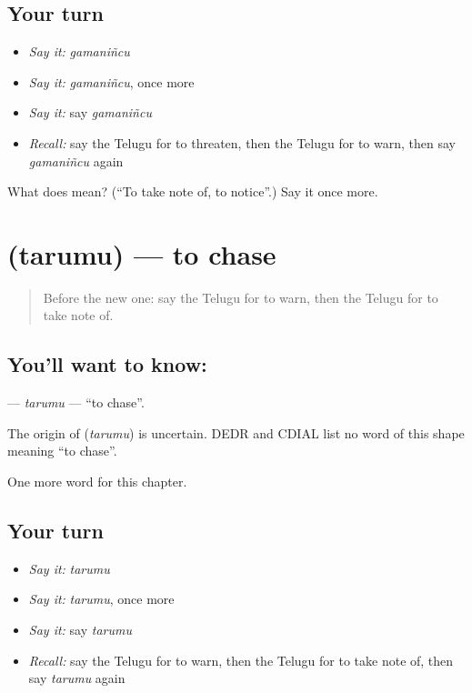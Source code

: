 \subsection*{Your turn}
\begin{itemize}
\raggedright
  \item \emph{Say it:} \emph{gamaniñcu}
  \item \emph{Say it:} \emph{gamaniñcu}, once more
  \item \emph{Say it:} say \emph{gamaniñcu}
  \item \emph{Recall:} say the Telugu for to threaten, then the Telugu for to warn, then say \emph{gamaniñcu} again
\end{itemize}

\begin{tcolorbox}[breakable,colback=teal!4,colframe=teal!35!black,title={Before you move on}]
What does  mean? (\textquotedblleft{}To take note of, to notice\textquotedblright{}.) Say it once more.
\end{tcolorbox}
\section[\texorpdfstring{\te{తరుము} (tarumu)}{తరుము (tarumu)}]{ (tarumu) — to chase}

\label{lesson:TE-C285-tarumu}



\begin{quote}
Before the new one: say the Telugu for to warn, then the Telugu for to take note of.
\end{quote}

\subsection*{You'll want to know: }
\textbf{} — \emph{tarumu} — \textquotedblleft{}to chase\textquotedblright{}.

\begin{cousinweb}
The origin of \textbf{} (\emph{tarumu}) is uncertain. DEDR and CDIAL list no word of this shape meaning \textquotedblleft{}to chase\textquotedblright{}.
\end{cousinweb}

\begin{grammarlens}[title={What you've built}]
One more word for this chapter.
\end{grammarlens}

\subsection*{Your turn}
\begin{itemize}
\raggedright
  \item \emph{Say it:} \emph{tarumu}
  \item \emph{Say it:} \emph{tarumu}, once more
  \item \emph{Say it:} say \emph{tarumu}
  \item \emph{Recall:} say the Telugu for to warn, then the Telugu for to take note of, then say \emph{tarumu} again
\end{itemize}

